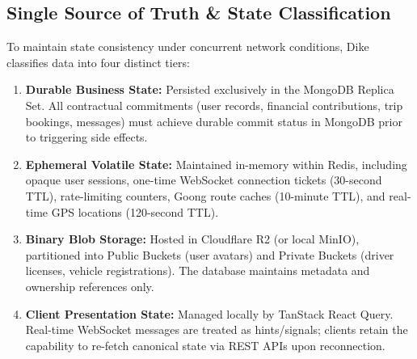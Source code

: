 \documentclass[conference,10pt,a4paper]{IEEEtran}
\begin{document}
\subsection{Single Source of Truth \& State Classification}
To maintain state consistency under concurrent network conditions, Dike classifies data into four distinct tiers:
\begin{enumerate}
    \item \textbf{Durable Business State:} Persisted exclusively in the MongoDB Replica Set. All contractual commitments (user records, financial contributions, trip bookings, messages) must achieve durable commit status in MongoDB prior to triggering side effects.
    \item \textbf{Ephemeral Volatile State:} Maintained in-memory within Redis, including opaque user sessions, one-time WebSocket connection tickets (30-second TTL), rate-limiting counters, Goong route caches (10-minute TTL), and real-time GPS locations (120-second TTL).
    \item \textbf{Binary Blob Storage:} Hosted in Cloudflare R2 (or local MinIO), partitioned into Public Buckets (user avatars) and Private Buckets (driver licenses, vehicle registrations). The database maintains metadata and ownership references only.
    \item \textbf{Client Presentation State:} Managed locally by TanStack React Query. Real-time WebSocket messages are treated as hints/signals; clients retain the capability to re-fetch canonical state via REST APIs upon reconnection.
\end{enumerate}
\end{document}
